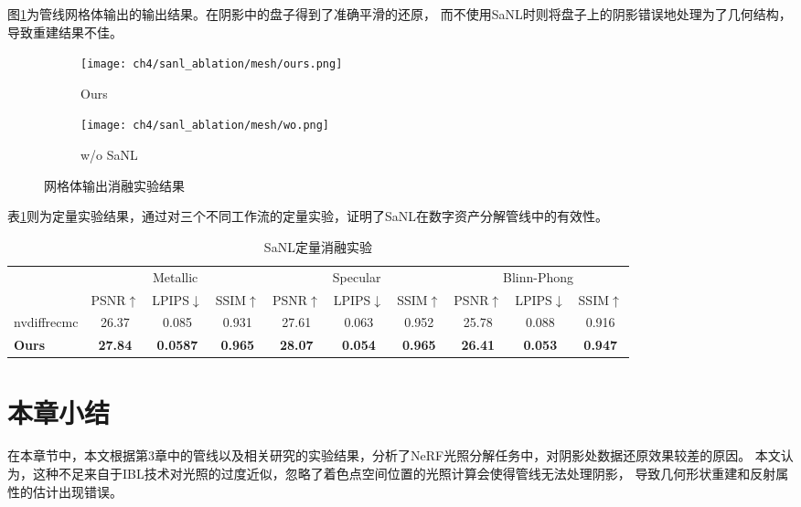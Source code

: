 图\ref{fig:mesh_ablation}为管线网格体输出的输出结果。在阴影中的盘子得到了准确平滑的还原，
而不使用SaNL时则将盘子上的阴影错误地处理为了几何结构，导致重建结果不佳。

\begin{figure}[H]
  \centering
  \begin{subfigure}[c]{0.47\textwidth}
    \centering
    \texttt{[image: ch4/sanl\_ablation/mesh/ours.png]}
    \caption{Ours}
  \end{subfigure}
  \begin{subfigure}[c]{0.47\textwidth}
    \centering
    \texttt{[image: ch4/sanl\_ablation/mesh/wo.png]}
    \caption{w/o SaNL}
  \end{subfigure}
  \caption{网格体输出消融实验结果}
  \label{fig:mesh_ablation}
\end{figure}

表\ref{tab:sanl_quan}则为定量实验结果，通过对三个不同工作流的定量实验，证明了SaNL在数字资产分解管线中的有效性。

\begin{table}[h]
  \centering
  \caption{SaNL定量消融实验}
  \begin{tabular}{l ccc ccc ccc}
      \toprule
      & \multicolumn{3}{c}{Metallic} & \multicolumn{3}{c}{Specular} & \multicolumn{3}{c}{Blinn-Phong} \\
      \cmidrule(lr){2-4} \cmidrule(lr){5-7} \cmidrule(lr){8-10}
      & PSNR$\uparrow$ & LPIPS$\downarrow$ & SSIM$\uparrow$ & PSNR$\uparrow$ & LPIPS$\downarrow$ & SSIM$\uparrow$ & PSNR$\uparrow$ & LPIPS$\downarrow$ & SSIM$\uparrow$ \\
      \midrule
      nvdiffrecmc & 26.37 & 0.085 & 0.931 & 27.61 & 0.063 & 0.952 & 25.78 & 0.088 & 0.916 \\
      \textbf{Ours} & \textbf{27.84} & \textbf{0.0587} & \textbf{0.965} & \textbf{28.07} & \textbf{0.054} & \textbf{0.965} & \textbf{26.41} & \textbf{0.053} & \textbf{0.947} \\
      \bottomrule
  \end{tabular}
  \label{tab:sanl_quan}
\end{table}

\section{本章小结}

在本章节中，本文根据第3章中的管线以及相关研究的实验结果，分析了NeRF光照分解任务中，对阴影处数据还原效果较差的原因。
本文认为，这种不足来自于IBL技术对光照的过度近似，忽略了着色点空间位置的光照计算会使得管线无法处理阴影，
导致几何形状重建和反射属性的估计出现错误。

